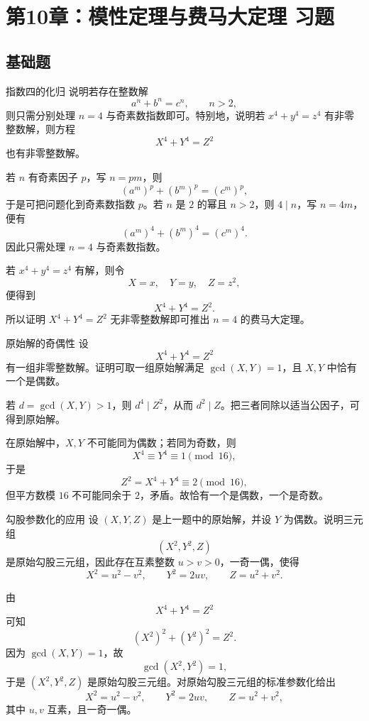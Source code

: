 \chapter{第10章：模性定理与费马大定理 习题}
\difficultykey

\section{基础题 \easy}

\begin{problem}{指数四的化归}
\easy
说明若存在整数解
\[
a^n+b^n=c^n,
\qquad n>2,
\]
则只需分别处理 $n=4$ 与奇素数指数即可。特别地，说明若 $x^4+y^4=z^4$ 有非零整数解，则方程
\[
X^4+Y^4=Z^2
\]
也有非零整数解。
\end{problem}
\begin{solution}
若 $n$ 有奇素因子 $p$，写 $n=pm$，则
\[
(a^m)^p+(b^m)^p=(c^m)^p,
\]
于是可把问题化到奇素数指数 $p$。若 $n$ 是 $2$ 的幂且 $n>2$，则 $4\mid n$，写 $n=4m$，便有
\[
(a^m)^4+(b^m)^4=(c^m)^4.
\]
因此只需处理 $n=4$ 与奇素数指数。

若 $x^4+y^4=z^4$ 有解，则令
\[
X=x,\quad Y=y,\quad Z=z^2,
\]
便得到
\[
X^4+Y^4=Z^2.
\]
所以证明 $X^4+Y^4=Z^2$ 无非零整数解即可推出 $n=4$ 的费马大定理。
\end{solution}

\begin{problem}{原始解的奇偶性}
\easy
设
\[
X^4+Y^4=Z^2
\]
有一组非零整数解。证明可取一组原始解满足 $\gcd(X,Y)=1$，且 $X,Y$ 中恰有一个是偶数。
\end{problem}
\begin{solution}
若 $d=\gcd(X,Y)>1$，则 $d^4\mid Z^2$，从而 $d^2\mid Z$。把三者同除以适当公因子，可得到原始解。

在原始解中，$X,Y$ 不可能同为偶数；若同为奇数，则
\[
X^4\equiv Y^4\equiv1\pmod{16},
\]
于是
\[
Z^2=X^4+Y^4\equiv2\pmod{16},
\]
但平方数模 $16$ 不可能同余于 $2$，矛盾。故恰有一个是偶数，一个是奇数。
\end{solution}

\begin{problem}{勾股参数化的应用}
\easy
设 $(X,Y,Z)$ 是上一题中的原始解，并设 $Y$ 为偶数。说明三元组
\[
(X^2,Y^2,Z)
\]
是原始勾股三元组，因此存在互素整数 $u>v>0$，一奇一偶，使得
\[
X^2=u^2-v^2,
\qquad
Y^2=2uv,
\qquad
Z=u^2+v^2.
\]
\end{problem}
\begin{solution}
由
\[
X^4+Y^4=Z^2
\]
可知
\[
(X^2)^2+(Y^2)^2=Z^2.
\]
因为 $\gcd(X,Y)=1$，故
\[
\gcd(X^2,Y^2)=1,
\]
于是 $(X^2,Y^2,Z)$ 是原始勾股三元组。对原始勾股三元组的标准参数化给出
\[
X^2=u^2-v^2,
\qquad
Y^2=2uv,
\qquad
Z=u^2+v^2,
\]
其中 $u,v$ 互素，且一奇一偶。
\end{solution}

